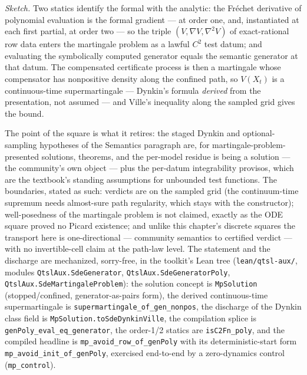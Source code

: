 \emph{Sketch.} Two statics identify the formal with the analytic:
the Fr\'echet derivative of polynomial evaluation is the formal
gradient --- at order one, and, instantiated at each first partial,
at order two --- so the triple $(V, \nabla V, \nabla^2 V)$ of
exact-rational row data enters the martingale problem as a lawful
$C^2$ test datum; and evaluating the symbolically computed generator
equals the semantic generator at that datum. The compensated
certificate process is then a martingale whose compensator has
nonpositive density along the confined path, so $V(X_t)$ is a
continuous-time supermartingale --- Dynkin's formula \emph{derived}
from the presentation, not assumed --- and Ville's inequality
\cite{ville1939} along the sampled grid gives the bound.

The point of the square is what it retires: the staged Dynkin and
optional-sampling hypotheses of the Semantics paragraph are, for
martingale-problem-presented solutions, theorems, and the per-model
residue is being a solution --- the community's own object --- plus
the per-datum integrability provisos, which are the textbook's
standing assumptions for unbounded test functions. The
boundaries, stated as such: verdicts are on the sampled grid (the
continuum-time supremum needs almost-sure path regularity, which
stays with the constructor); well-posedness of the martingale
problem is not claimed, exactly as the ODE square proved no Picard
existence; and unlike this chapter's discrete squares the transport
here is one-directional --- community semantics to certified verdict
--- with no invertible-cell claim at the path-law level. The
statement and the discharge are mechanized, sorry-free, in the
toolkit's Lean tree (\texttt{lean/qtsl-aux/}, modules
\texttt{QtslAux.SdeGenerator}, \texttt{QtslAux.SdeGeneratorPoly},
\texttt{QtslAux.SdeMartingaleProblem}): the solution concept is
\texttt{MpSolution} (stopped/confined, generator-as-pairs form), the
derived continuous-time supermartingale is
\texttt{supermartingale\_of\_gen\_nonpos}, the discharge of the
Dynkin class field is \texttt{MpSolution.toSdeDynkinVille}, the
compilation splice is \texttt{genPoly\_eval\_eq\_generator}, the
order-1/2 statics are \texttt{isC2Fn\_poly}, and the compiled
headline is \texttt{mp\_avoid\_row\_of\_genPoly} with its
deterministic-start form \texttt{mp\_avoid\_init\_of\_genPoly},
exercised end-to-end by a zero-dynamics control
(\texttt{mp\_control}).


